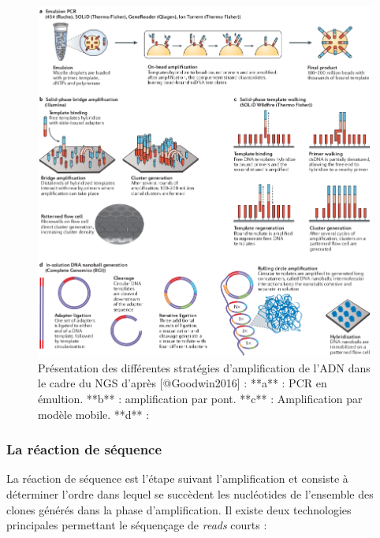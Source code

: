 \documentclass[12pt,twoside]{reedthesis}
\theoremstyle{definition}
\theoremstyle{definition}
\theoremstyle{remark}
\begin{document}
  \begin{figure}
  
  {\centering \includegraphics[scale=.455]{figure/ngs_amplification} 
  
  }
  
  \caption[Présentation des différentes stratégies d'amplification de l'ADN dans le cadre du NGS]{Présentation des différentes stratégies d'amplification de l'ADN dans le cadre du NGS d'après [@Goodwin2016] : **a** : PCR en émultion. **b** : amplification par pont. **c** : Amplification par modèle mobile. **d** : }\label{fig:ngsampli}
  \end{figure}
  
  \subsubsection{La réaction de séquence}\label{la-reaction-de-sequence}
  
  La réaction de séquence est l'étape suivant l'amplification et consiste
  à déterminer l'ordre dans lequel se succèdent les nucléotides de
  l'ensemble des clones générés dans la phase d'amplification. Il existe
  deux technologies principales permettant le séquençage de \emph{reads}
  courts :\\
  
\end{document}
